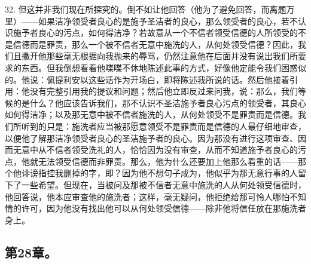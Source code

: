 32. 但这并非我们现在所探究的。倒不如让他回答（他为了避免回答，而离题万里）——如果洁净领受者良心的是施予圣洁者的良心，那么领受者的良心，若不认识施予者良心的污点，如何得洁净？若故意从一个不信者领受信德的人所领受的不是信德而是罪责，那么一个被不信者无意中施洗的人，从何处领受信德？因此，我们且撇开他那些毫无根据向我抛来的辱骂，仍然注意他在后面并没有说出我们所要求的东西。但我倒想看看他喋喋不休地陈述此事的方式，好像他定能令我们困惑似的。他说：佩提利安以这些话作为开场白，即将陈述我所说的话。然后他接着引用：他没有完整引用我的提议和问题；然后他立即反过来问我，说：那么，我们等候的是什么？他应该告诉我们，那不认识不圣洁施予者良心污点的领受者，其良心如何得洁净；以及那无意中被不信者施洗的人，从何处领受不是罪责而是信德。我们所听到的只是：施洗者应当被那愿意领受不是罪责而是信德的人最仔细地审查，以便他了解那洁净领受者良心的圣洁施予者的良心。因为那没有进行这项审查、因而无意中从不信者领受洗礼的人，恰恰因为没有审查，从而不知道施予者良心的污点，他就无法领受信德而非罪责。那么，他为什么还要加上他那么看重的话——那个他诽谤指控我删掉的字，即？因为他不想句子成为，他似乎为那无意行事的人留下了一些希望。但现在，当被问及那被不信者无意中施洗的人从何处领受信德时，他回答说，他本应审查他的施洗者；这样，毫无疑问，他拒绝给那可怜人哪怕不知情的许可，因为他没有找出他可以从何处领受信德——除非他将信任放在那施洗者身上。\par


\subsection{第28章。}

